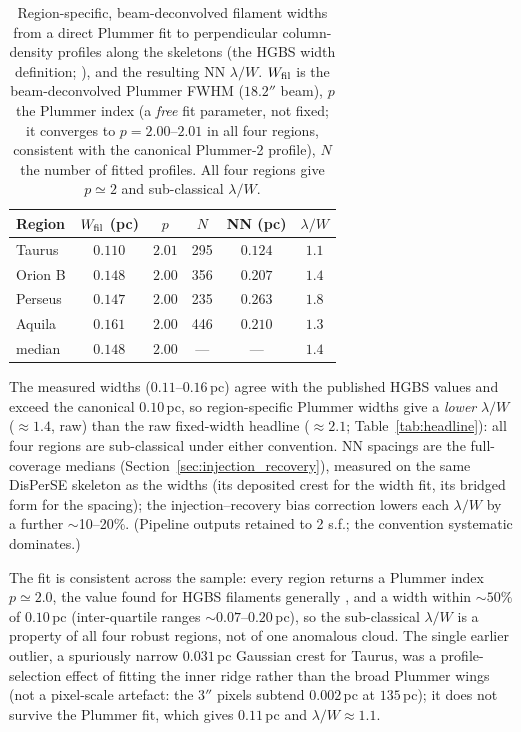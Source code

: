 \documentclass[usenatbib,twoside,twocolumn]{mnras}
\begin{document}
\begin{table}
\caption{Region-specific, beam-deconvolved filament widths from a direct Plummer fit to perpendicular column-density profiles along the skeletons (the HGBS width definition; \citealt{Arzoumanian2019}), and the resulting NN $\lambda/W$. $W_{\rm fil}$ is the beam-deconvolved Plummer FWHM ($18.2''$ beam), $p$ the Plummer index (a \emph{free} fit parameter, not fixed; it converges to $p=2.00$--$2.01$ in all four regions, consistent with the canonical Plummer-2 profile), $N$ the number of fitted profiles. All four regions give $p\simeq2$ and sub-classical $\lambda/W$.}
\label{tab:widths}
\footnotesize
\setlength{\tabcolsep}{3pt}
\begin{tabular}{p{1.7cm}ccccc}
\toprule
Region & $W_{\rm fil}$ (pc) & $p$ & $N$ & NN (pc) & $\lambda/W$ \\
\midrule
Taurus  & $0.110$ & $2.01$ & 295 & $0.124$ & $1.1$ \\
Orion B & $0.148$ & $2.00$ & 356 & $0.207$ & $1.4$ \\
Perseus & $0.147$ & $2.00$ & 235 & $0.263$ & $1.8$ \\
Aquila  & $0.161$ & $2.00$ & 446 & $0.210$ & $1.3$ \\
\midrule
median  & $0.148$ & $2.00$ & --- & --- & $1.4$ \\
\bottomrule
\end{tabular}
\par\vspace{2pt}
\footnotesize The measured widths ($0.11$--$0.16$\,pc) agree with the published HGBS values and exceed the canonical $0.10$\,pc, so region-specific Plummer widths give a \emph{lower} $\lambda/W$ ($\approx1.4$, raw) than the raw fixed-width headline ($\approx2.1$; Table~\ref{tab:headline}): all four regions are sub-classical under either convention. NN spacings are the full-coverage medians (Section~\ref{sec:injection_recovery}), measured on the same DisPerSE skeleton as the widths (its deposited crest for the width fit, its bridged form for the spacing); the injection--recovery bias correction lowers each $\lambda/W$ by a further $\sim$10--20\%. (Pipeline outputs retained to 2 s.f.; the convention systematic dominates.)
\end{table}

The fit is consistent across the sample: every region returns a Plummer index $p\simeq2.0$, the value found for HGBS filaments generally \citep{Arzoumanian2019}, and a width within $\sim50\%$ of $0.10$\,pc (inter-quartile ranges $\sim0.07$--$0.20$\,pc), so the sub-classical $\lambda/W$ is a property of all four robust regions, not of one anomalous cloud. The single earlier outlier, a spuriously narrow $0.031$\,pc Gaussian crest for Taurus, was a profile-selection effect of fitting the inner ridge rather than the broad Plummer wings (not a pixel-scale artefact: the $3''$ pixels subtend $0.002$\,pc at $135$\,pc); it does not survive the Plummer fit, which gives $0.11$\,pc and $\lambda/W\approx1.1$.
\end{document}
